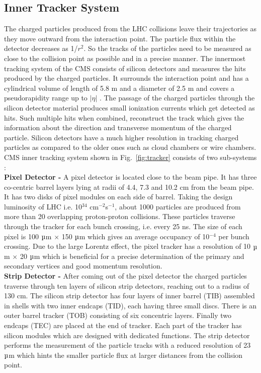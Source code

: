 \subsection{Inner Tracker System}
The charged particles produced from the LHC collisions leave their trajectories as they move outward from the interaction point. The particle flux within the detector decreases as 1/$r^2$. So the tracks of the particles need to be measured as close to the collision point as possible and in a precise manner. The innermost tracking system of the CMS consists of silicon detectors and measures the hits produced by the charged particles. It surrounds the interaction point and has a cylindrical volume of length of 5.8 m and a diameter of 2.5 m and covers a pseudorapidity range up to $|\eta|$ . The passage of the charged particles through the silicon detector material produces small ionization currents which get detected as hits. Such multiple hits when combined, reconstruct the track which gives the information about the direction and transverse momentum \pt of the charged particle. Silicon detectors have a much higher resolution in tracking charged particles as compared to the older ones such as cloud chambers or wire chambers. CMS inner tracking system shown in Fig.~\ref{fig:tracker} consists of two sub-systems :\\ \newline 
{\bf Pixel Detector -} A pixel detector is located close to the beam pipe. It has three co-centric barrel layers lying at radii of 4.4, 7.3 and 10.2 cm from the beam pipe. It has two disks of pixel modules on each side of barrel. Taking the design luminosity of LHC i.e. 10$^{34}$ cm$^{-2}$s$^{-1}$, about 1000 particles are produced from more than 20 overlapping proton-proton collisions. These particles traverse through the tracker for each bunch crossing, i.e. every 25 ns. The size of each pixel is 100 $\micro$m $\times$ 150 $\micro$m which gives an average occupancy of 10$^{-4}$ per bunch crossing. Due to the large Lorentz effect, the pixel tracker has a resolution of 10 $\micro$m $\times$ 20 $\micro$m which is beneficial for a precise determination of the primary and secondary vertices and good momentum resolution. \\ \newline
{\bf Strip Detector -} After coming out of the pixel detector the charged particles traverse through ten layers of silicon strip detectors, reaching out to a radius of 130 cm. The silicon strip detector has four layers of inner barrel (TIB) assembled in shells with two inner endcaps (TID), each having three small discs. There is an outer barrel tracker (TOB) consisting of six concentric layers. Finally two endcaps (TEC) are placed at the end of tracker. Each part of the tracker has silicon modules which are designed with dedicated functions. The strip detector performs the measurement of the particle tracks with a reduced resolution of 23 $\micro$m which hints the smaller particle flux at larger distances from the collision point.
